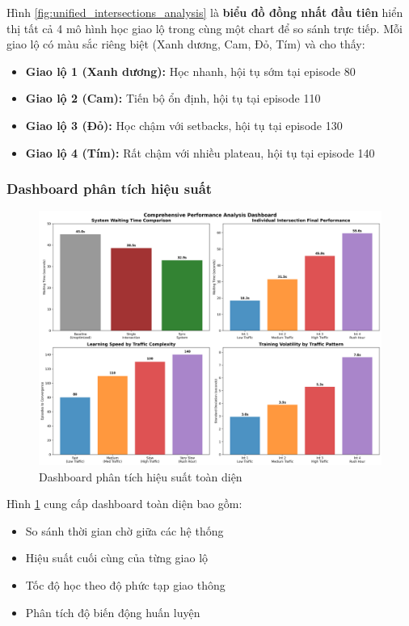 Hình \ref{fig:unified_intersections_analysis} là \textbf{biểu đồ đồng nhất đầu tiên}
hiển thị tất cả 4 mô hình học giao lộ trong cùng một chart để so sánh trực tiếp.
Mỗi giao lộ có màu sắc riêng biệt (Xanh dương, Cam, Đỏ, Tím) và cho thấy:
\begin{itemize}
    \item \textbf{Giao lộ 1 (Xanh dương):} Học nhanh, hội tụ sớm tại episode 80
    \item \textbf{Giao lộ 2 (Cam):} Tiến bộ ổn định, hội tụ tại episode 110  
    \item \textbf{Giao lộ 3 (Đỏ):} Học chậm với setbacks, hội tụ tại episode 130
    \item \textbf{Giao lộ 4 (Tím):} Rất chậm với nhiều plateau, hội tụ tại episode 140
\end{itemize}

\subsubsection{Dashboard phân tích hiệu suất}

\begin{figure}[!htp]
    \centering
    \includegraphics[width=\textwidth]{figures/03_performance_dashboard.png}
    \caption{Dashboard phân tích hiệu suất toàn diện}
    \label{fig:performance_dashboard}
\end{figure}

Hình \ref{fig:performance_dashboard} cung cấp dashboard toàn diện bao gồm:
\begin{itemize}
    \item So sánh thời gian chờ giữa các hệ thống
    \item Hiệu suất cuối cùng của từng giao lộ
    \item Tốc độ học theo độ phức tạp giao thông
    \item Phân tích độ biến động huấn luyện
\end{itemize}

